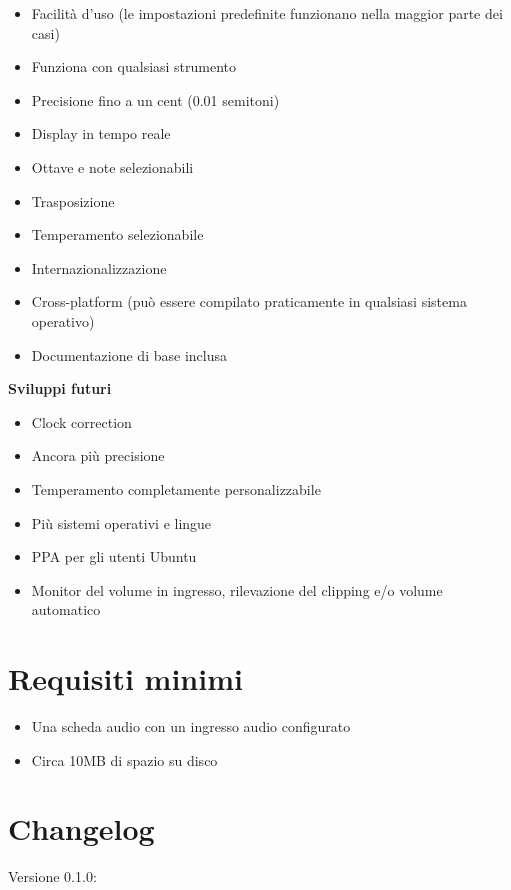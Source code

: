 \begin{itemize}
	\item Facilità d'uso (le impostazioni predefinite funzionano nella maggior parte dei casi)
	\item Funziona con qualsiasi strumento
	\item Precisione fino a un cent (0.01 semitoni)
	\item Display in tempo reale
	\item Ottave e note selezionabili
	\item Trasposizione
	\item Temperamento selezionabile
	\item Internazionalizzazione
	\item Cross-platform (può essere compilato praticamente in qualsiasi sistema operativo)
	\item Documentazione di base inclusa
\end{itemize}

\textbf{Sviluppi futuri}
\begin{itemize}
	\item Clock correction
	\item Ancora più precisione
	\item Temperamento completamente personalizzabile
	\item Più sistemi operativi e lingue
	\item PPA per gli utenti Ubuntu
	\item Monitor del volume in ingresso, rilevazione del clipping e/o volume automatico
\end{itemize}

\section{Requisiti minimi}\label{requirements}

\begin{itemize}
\item Una scheda audio con un ingresso audio configurato
\item Circa 10MB di spazio su disco
\end{itemize}

\section{Changelog}\label{changelog}

Versione 0.1.0:

